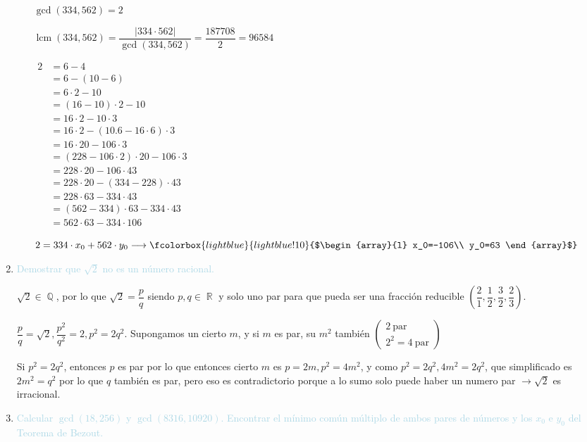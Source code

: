 \documentclass{article}
\newcommand{\bboxed}[1]{\fcolorbox{lightblue}{lightblue!10}{$#1$}}
\newcommand{\lb}[1]{\textcolor{lightblue}{#1}}
\DeclareMathOperator{\R}{\mathbb{R}}
\DeclareMathOperator{\Q}{\mathbb{Q}}
\DeclareMathOperator{\lcm}{lcm}
\begin{document}
\begin{enumerate}[label=\color{red}\textbf{\arabic*)}, leftmargin=*]
\begin{itemize}[label=\color{lightblue}$-$]
		$\gcd(334,562)=2$
		
		$\lcm(334,562)=\dfrac{|334\cdot562|}{\gcd(334,562)}=\dfrac{187708}{2}=96584$
		
		$\begin{aligned}
			2&=6-4\\
			&=6-(10-6)\\
			&=6\cdot2-10\\
			&=(16-10)\cdot2-10\\
			&=16\cdot2-10\cdot3\\
			&=16\cdot2-(10.6-16\cdot6)\cdot3\\
			&=16\cdot20-106\cdot3\\
			&=(228-106\cdot2)\cdot20-106\cdot3\\
			&=228\cdot20-106\cdot43\\
			&=228\cdot20-(334-228)\cdot43\\
			&=228\cdot63-334\cdot43\\
			&=(562-334)\cdot63-334\cdot43\\
			&=562\cdot63-334\cdot106
		\end{aligned}$
		
		$2=334\cdot x_0+562\cdot y_0\longrightarrow\bboxed{\begin{array}{l}
				x_0=-106\\
				y_0=63
		\end{array}}$
	\end{itemize}
	\item \lb{Demostrar que $\sqrt{2}$ no es un número racional.}
	
	$\sqrt{2}\in\Q$, por lo que $\sqrt{2}=\dfrac{p}{q}$ siendo $p,q\in\R$ y solo uno par para que pueda ser una fracción reducible $\left(\dfrac{2}{1},\dfrac{1}{2},\dfrac{3}{2},\dfrac{2}{3}\right)$.
	
	$\dfrac{p}{q}=\sqrt{2},\dfrac{p^2}{q^2}=2,p^2=2q^2$. Supongamos un cierto $m$, y si $m$ es par, su $m^2$ también $\left(\begin{array}{l}
		2\:\mathrm{par}\\
		2^2=4\:\mathrm{par}
	\end{array}\right)$
	
	Si $p^2=2q^2$, entonces $p$ es par por lo que entonces cierto $m$ es $p=2m,p^2=4m^2$, y como $p^2=2q^2,4m^2=2q^2$, que simplificado es $2m^2=q^2$ por lo que $q$ también es par, pero eso es contradictorio porque a lo sumo solo puede haber un numero par $\longrightarrow\sqrt{2}$ es irracional.
	\item \lb{Calcular $\gcd(18,256)$ y $\gcd(8316,10920)$. Encontrar el mínimo común múltiplo de ambos pares de números y los $x_0$ e $y_0$ del Teorema de Bezout.}
	

\end{enumerate}
\end{document}
